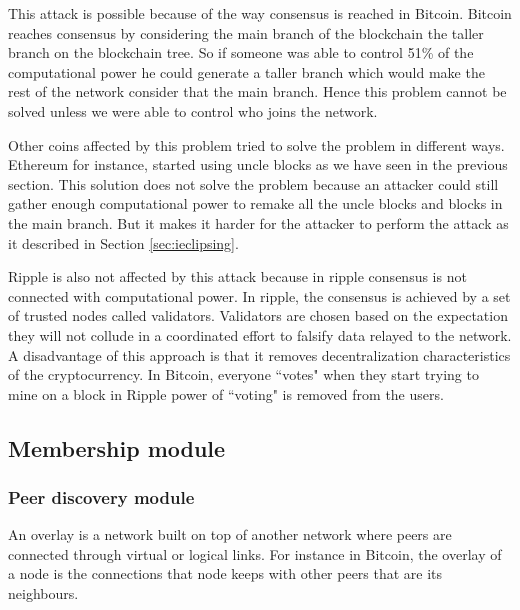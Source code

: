 
This attack is possible because of the way consensus is reached in Bitcoin. Bitcoin reaches consensus by considering the main branch of the blockchain the taller branch on the blockchain tree. So if someone was able to control 51\% of the computational power he could generate a taller branch which would make the rest of the network consider that the main branch. Hence this problem cannot be solved unless we were able to control who joins the network.

Other coins affected by this problem tried to solve the problem in different ways. Ethereum for instance, started using uncle blocks as we have seen in the previous section. This solution does not solve the problem because an attacker could still gather enough computational power to remake all the uncle blocks and blocks in the main branch. But it makes it harder for the attacker to perform the attack as it described in Section \ref{sec:ieclipsing}.

Ripple is also not affected by this attack because in ripple consensus is not connected with computational power. In ripple, the consensus is achieved by a set of trusted nodes called validators. Validators are chosen based on the expectation they will not collude in a coordinated effort to falsify data relayed to the network. A disadvantage of this approach is that it removes decentralization characteristics of the cryptocurrency. In Bitcoin, everyone ``votes" when they start trying to mine on a block in Ripple power of ``voting" is removed from the users.

\subsection{Membership module}
\label{sec:m_module}

\subsubsection{Peer discovery module}
\label{sec:peer_disc_module}


\label{sec:secureoverlays}
An overlay is a network built on top of another network where peers are connected through virtual or logical links. For instance in Bitcoin, the overlay of a node is the connections that node keeps with other peers that are its neighbours.

